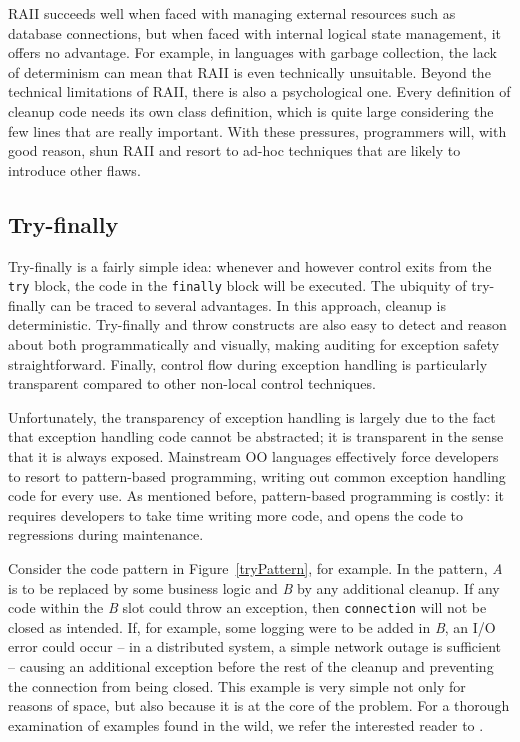 \documentclass[11pt]{article}
\newcommand{\maybePage}{\newpage}
\begin{document}
RAII succeeds well when faced with managing external resources such as database connections, but when faced with internal logical state management, it offers no advantage.
For example, in languages with garbage collection, the lack of determinism can mean that RAII is even technically unsuitable.
Beyond the technical limitations of RAII, there is also a psychological one.
Every definition of cleanup code needs its own class definition, which is quite large considering the few lines that are really important.
With these pressures, programmers will, with good reason, shun RAII and resort to ad-hoc techniques that are likely to introduce other flaws.


\maybePage
\subsection{Try-finally}
\label{try-finally}

Try-finally is a fairly simple idea: whenever and however control exits from the \texttt{try} block, the code in the \texttt{finally} block will be executed.
The ubiquity of try-finally can be traced to several advantages.
In this approach, cleanup is deterministic.
Try-finally and throw constructs are also easy to detect and reason about both programmatically and visually, making auditing for exception safety straightforward.
Finally, control flow during exception handling is particularly transparent compared to other non-local control techniques.

Unfortunately, the transparency of exception handling is largely due to the fact that exception handling code cannot be abstracted;
it is transparent in the sense that it is always exposed.
Mainstream OO languages effectively force developers to resort to pattern-based programming, writing out common exception handling code for every use.
As mentioned before, pattern-based programming is costly: it requires developers to take time writing more code, and opens the code to regressions during maintenance.

Consider the code pattern in Figure~\ref{tryPattern}, for example.
In the pattern, \textit{A} is to be replaced by some business logic and \textit{B} by any additional cleanup.
If any code within the \textit{B} slot could throw an exception, then \texttt{connection} will not be closed as intended.
If, for example, some logging were to be added in \textit{B}, an I/O error could occur -- in a distributed system, a simple network outage is sufficient -- causing an additional exception before the rest of the cleanup and preventing the connection from being closed.
This example is very simple not only for reasons of space, but also because it is at the core of the problem.
For a thorough examination of examples found in the wild, we refer the interested reader to \cite{WeimerNecula08}.
\end{document}
